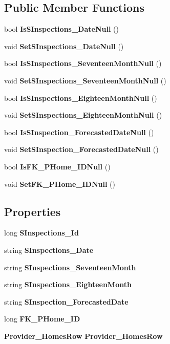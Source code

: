 \subsection*{Public Member Functions}
\begin{DoxyCompactItemize}
\item 
bool \textbf{ Is\+S\+Inspections\+\_\+\+Date\+Null} ()
\item 
void \textbf{ Set\+S\+Inspections\+\_\+\+Date\+Null} ()
\item 
bool \textbf{ Is\+S\+Inspections\+\_\+\+Seventeen\+Month\+Null} ()
\item 
void \textbf{ Set\+S\+Inspections\+\_\+\+Seventeen\+Month\+Null} ()
\item 
bool \textbf{ Is\+S\+Inspections\+\_\+\+Eighteen\+Month\+Null} ()
\item 
void \textbf{ Set\+S\+Inspections\+\_\+\+Eighteen\+Month\+Null} ()
\item 
bool \textbf{ Is\+S\+Inspection\+\_\+\+Forecasted\+Date\+Null} ()
\item 
void \textbf{ Set\+S\+Inspection\+\_\+\+Forecasted\+Date\+Null} ()
\item 
bool \textbf{ Is\+F\+K\+\_\+\+P\+Home\+\_\+\+I\+D\+Null} ()
\item 
void \textbf{ Set\+F\+K\+\_\+\+P\+Home\+\_\+\+I\+D\+Null} ()
\end{DoxyCompactItemize}
\subsection*{Properties}
\begin{DoxyCompactItemize}
\item 
long \textbf{ S\+Inspections\+\_\+\+Id}\hspace{0.3cm}{\ttfamily  [get, set]}
\item 
string \textbf{ S\+Inspections\+\_\+\+Date}\hspace{0.3cm}{\ttfamily  [get, set]}
\item 
string \textbf{ S\+Inspections\+\_\+\+Seventeen\+Month}\hspace{0.3cm}{\ttfamily  [get, set]}
\item 
string \textbf{ S\+Inspections\+\_\+\+Eighteen\+Month}\hspace{0.3cm}{\ttfamily  [get, set]}
\item 
string \textbf{ S\+Inspection\+\_\+\+Forecasted\+Date}\hspace{0.3cm}{\ttfamily  [get, set]}
\item 
long \textbf{ F\+K\+\_\+\+P\+Home\+\_\+\+ID}\hspace{0.3cm}{\ttfamily  [get, set]}
\item 
\textbf{ Provider\+\_\+\+Homes\+Row} \textbf{ Provider\+\_\+\+Homes\+Row}\hspace{0.3cm}{\ttfamily  [get, set]}
\end{DoxyCompactItemize}


